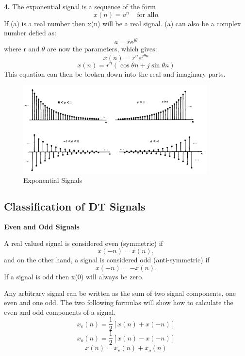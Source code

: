 \documentclass{article} %
\begin{document}
	\textbf{4.} The exponential signal is a sequence of the form
	\begin{equation}
 	 x(n) = a^n \;\;\;\; \text{for all} n
	\end{equation}
	If (a) is a real number then x(n) will be a real signal. (a) can also be a complex number defied as:
	\begin{equation}
 	a = re^{j\theta}
	\end{equation}
	where r and $\theta$ are now the parameters, which gives:
	\begin{equation}
 	 x(n) = r^ne^{j\theta n}
	\end{equation}
	\begin{equation}
 	 x(n) = r^n(\cos \theta n + j\sin \theta n)
	\end{equation}
	This equation can then be broken down into the real and imaginary parts.
	\begin{figure}[h]
    \centering
	\includegraphics[width=10cm]{exp}
	\caption{Exponential Signals}
	\end{figure}
	
	\subsection{Classification of DT Signals}
	\textbf{Even and Odd Signals}
	
	A real valued signal is considered even (symmetric) if
	\begin{equation}
 	 x(-n) = x(n),
	\end{equation}
	and on the other hand, a signal is considered odd (anti-symmetric) if
	\begin{equation}
 	 x(-n) = -x(n).
	\end{equation}
	If a signal is odd then x(0) will always be zero. 
	
	Any arbitrary signal can be written as the sum of two signal components, one even and one odd. The two following formulas will show how to calculate the even and odd components of a signal.
	\begin{equation}
 	 x_e(n) = \frac{1}{2} [x(n) + x(-n)]
	\end{equation}
	\begin{equation}
 	 x_o(n) = \frac{1}{2} [x(n) - x(-n)]
	\end{equation}
	\begin{equation}
 	 x(n) = x_e(n) + x_o(n)
	\end{equation}
	
\end{document}
